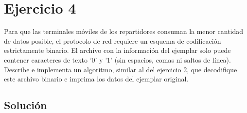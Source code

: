\section{Ejercicio 4}

\begin{tcolorbox}[enunciado]
Para que las terminales móviles de los repartidores consuman la menor cantidad de datos posible, el protocolo de red requiere un esquema de codificación estrictamente binario. El archivo con la información del ejemplar solo puede contener caracteres de texto '0' y '1' (sin espacios, comas ni saltos de línea). Describe e implementa un algoritmo, similar al del ejercicio 2, que decodifique este archivo binario e imprima los datos del ejemplar original.
\end{tcolorbox}

\subsection{Solución}
